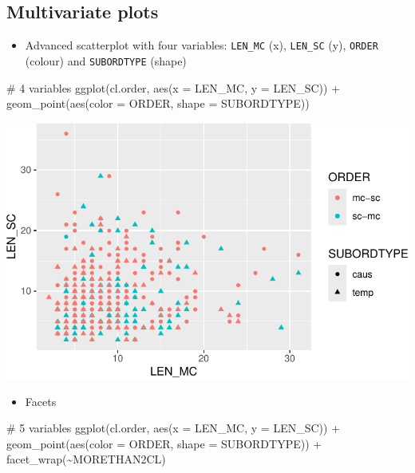 \documentclass[
  11pt,
  letterpaper,
  DIV=11,
  numbers=noendperiod]{scrreprt}
\newenvironment{Shaded}{\begin{snugshade}}{\end{snugshade}}
\newcommand{\AttributeTok}[1]{\textcolor[rgb]{0.40,0.45,0.13}{#1}}
\newcommand{\CommentTok}[1]{\textcolor[rgb]{0.37,0.37,0.37}{#1}}
\newcommand{\FunctionTok}[1]{\textcolor[rgb]{0.28,0.35,0.67}{#1}}
\newcommand{\NormalTok}[1]{\textcolor[rgb]{0.00,0.23,0.31}{#1}}
\newcommand{\SpecialCharTok}[1]{\textcolor[rgb]{0.37,0.37,0.37}{#1}}
\providecommand{\tightlist}{%
  \setlength{\itemsep}{0pt}\setlength{\parskip}{0pt}}\usepackage{longtable,booktabs,array}
\begin{document}
\subsection{Multivariate plots}\label{multivariate-plots}

\begin{itemize}
\tightlist
\item
  Advanced scatterplot with four variables: \texttt{LEN\_MC} (x),
  \texttt{LEN\_SC} (y), \texttt{ORDER} (colour) and \texttt{SUBORDTYPE}
  (shape)
\end{itemize}

\begin{Shaded}
\begin{Highlighting}[]
\CommentTok{\# 4 variables}
\FunctionTok{ggplot}\NormalTok{(cl.order, }\FunctionTok{aes}\NormalTok{(}\AttributeTok{x =}\NormalTok{ LEN\_MC, }\AttributeTok{y =}\NormalTok{ LEN\_SC)) }\SpecialCharTok{+}
  \FunctionTok{geom\_point}\NormalTok{(}\FunctionTok{aes}\NormalTok{(}\AttributeTok{color =}\NormalTok{ ORDER, }\AttributeTok{shape =}\NormalTok{ SUBORDTYPE))}
\end{Highlighting}
\end{Shaded}

\includegraphics{Summary_statistics_files/figure-pdf/unnamed-chunk-28-1.pdf}

\begin{itemize}
\tightlist
\item
  Facets
\end{itemize}

\begin{Shaded}
\begin{Highlighting}[]
\CommentTok{\# 5 variables}
\FunctionTok{ggplot}\NormalTok{(cl.order, }\FunctionTok{aes}\NormalTok{(}\AttributeTok{x =}\NormalTok{ LEN\_MC, }\AttributeTok{y =}\NormalTok{ LEN\_SC)) }\SpecialCharTok{+}
  \FunctionTok{geom\_point}\NormalTok{(}\FunctionTok{aes}\NormalTok{(}\AttributeTok{color =}\NormalTok{ ORDER, }\AttributeTok{shape =}\NormalTok{ SUBORDTYPE)) }\SpecialCharTok{+}
  \FunctionTok{facet\_wrap}\NormalTok{(}\SpecialCharTok{\textasciitilde{}}\NormalTok{MORETHAN2CL)}
\end{Highlighting}
\end{Shaded}
\end{document}
